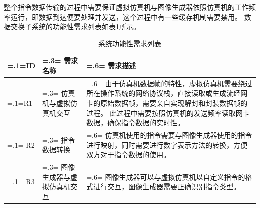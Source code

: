 \par
整个指令数据传输的过程中需要保证虚拟仿真机与图像生成器依照仿真机的工作频率运行，即数据到达便要处理并发送，这个过程中有一些缓存机制需要禁用。
数据交换子系统的功能性需求列表如表\ref{funcreq}所示。
\begin{table}[h!]
    \begin{center}
        \caption{系统功能性需求列表}
        \label{funcreq}
        \renewcommand\arraystretch{1.5}
        \begin{tabularx}{\textwidth}{ 
            | >{\centering\arraybackslash\hsize=.1\hsize\linewidth=\hsize}X 
            | >{\centering\arraybackslash\hsize=.3\hsize\linewidth=\hsize}X 
            | >{\raggedright\arraybackslash\hsize=.6\hsize\linewidth=\hsize}X 
            | }
            \hline
            \textbf{ID} & \textbf{需求名称} & \textbf{需求描述}\\
            \hline
            R1 & 仿真机与虚拟仿真机交互 & 由于仿真机数据帧的特性，虚拟仿真机需要绕过所在操作系统的网络协议栈，直接读取或生成流经网卡的原始数据帧，需要亲自实现解封和封装数据帧的过程。
                                        此过程中需要按照仿真机的发送频率读取网卡数据，确保指令数据的实时性。\\
            \hline
            R2 & 指令数据转换 & 仿真机使用的指令需要与图像生成器使用的指令进行映射，同时需要进行数字表示方法的转换，方便双方对于指令数据的使用。\\
            \hline 
            R3 & 图像生成器与虚拟仿真机交互 & 图像生成器可以与虚拟仿真机以自定义指令的格式进行交互，图像生成器需要正确识别指令类型。\\
            \hline
        \end{tabularx}
    \end{center}
\end{table}


